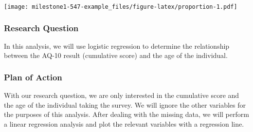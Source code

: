 \documentclass[]{article}
\newenvironment{Shaded}{\begin{snugshade}}{\end{snugshade}}
\newcommand{\CharTok}[1]{\textcolor[rgb]{0.31,0.60,0.02}{#1}}
\newcommand{\DataTypeTok}[1]{\textcolor[rgb]{0.13,0.29,0.53}{#1}}
\newcommand{\DecValTok}[1]{\textcolor[rgb]{0.00,0.00,0.81}{#1}}
\newcommand{\KeywordTok}[1]{\textcolor[rgb]{0.13,0.29,0.53}{\textbf{#1}}}
\newcommand{\NormalTok}[1]{#1}
\newcommand{\OperatorTok}[1]{\textcolor[rgb]{0.81,0.36,0.00}{\textbf{#1}}}
\newcommand{\StringTok}[1]{\textcolor[rgb]{0.31,0.60,0.02}{#1}}
\begin{document}
\begin{Shaded}
\end{Shaded}

\texttt{[image: milestone1-547-example\_files/figure-latex/proportion-1.pdf]}

\hypertarget{research-question}{%
\subsubsection{Research Question}\label{research-question}}

In this analysis, we will use logistic regression to determine the
relationship between the AQ-10 result (cumulative score) and the age of
the individual.

\hypertarget{plan-of-action}{%
\subsubsection{Plan of Action}\label{plan-of-action}}

With our research question, we are only interested in the cumulative
score and the age of the individual taking the survey. We will ignore
the other variables for the purposes of this analysis. After dealing
with the missing data, we will perform a linear regression analysis and
plot the relevant variables with a regression line.
\end{document}
